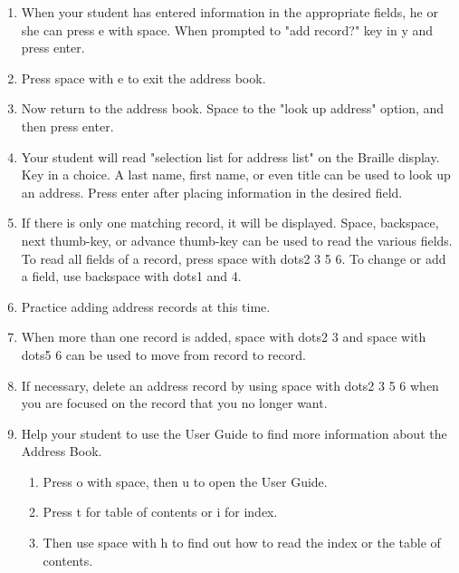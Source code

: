 \documentclass[10pt,letterpaper,twoside]{report}
\begin{document}
{{{\begin{enumerate}
\begin{enumerate}
		      \item Business title
		      \item Company name
		      \item Department
		      \item Business street address
		      \item Business state
		      \item Business zip
		      \item Business country
		      \item Web page
		      \item Notes
	      \end{enumerate}
	\item When your student has entered information in the appropriate fields, he or she can press e with space. When prompted to "add record?" key in y and press enter.
	\item Press space with e to exit the address book.
	\item Now return to the address book.  Space to the "look up address" option, and then press enter.
	\item Your student will read "selection list for address list" on the Braille display.  Key in a choice.  A last name, first name, or even title can be used to look up an address.  Press enter after placing information in the desired field.
	\item If there is only one matching record, it will be displayed.  Space, backspace, next thumb-key, or advance thumb-key can be used to read the various fields.  To read all fields of a record, press space with dots2 3 5 6.  To change or add a field, use backspace with dots1 and 4.
	\item Practice adding address records at this time.
	\item When more than one record is added, space with dots2 3 and space with dots5 6 can be used to move from record to record.
	\item If necessary, delete an address record by using space with dots2 3 5 6 when you are focused on the record that you no longer want.
	\item Help your student to use the User Guide to find more information about the Address Book.
	      \begin{enumerate}
		      \item Press o with space, then u to open the User Guide.
		      \item Press t for table of contents or i for index.
		      \item Then use space with h to find out how to read the index or the table of contents.
	      \end{enumerate}
\end{enumerate}

}}}
\end{document}
